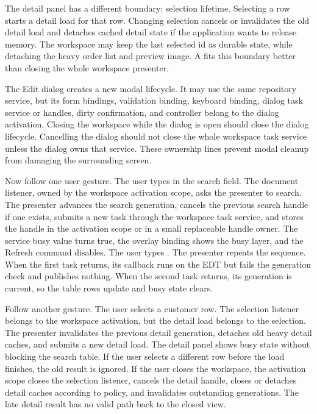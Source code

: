 The detail panel has a different boundary: selection lifetime. Selecting a row
starts a detail load for that row. Changing selection cancels or invalidates
the old detail load and detaches cached detail state if the application wants
to release memory. The workspace may keep the last selected id as durable
state, while detaching the heavy order list and preview image. A
 fits this boundary better than closing the whole
workspace presenter.

The Edit dialog creates a new modal lifecycle. It may use the same repository
service, but its form bindings, validation binding, keyboard binding, dialog
task service or handles, dirty confirmation, and controller belong to the
dialog activation. Closing the workspace while the dialog is open should close
the dialog lifecycle. Cancelling the dialog should not close the whole
workspace task service unless the dialog owns that service. These ownership
lines prevent modal cleanup from damaging the surrounding screen.

Now follow one user gesture. The user types  in the search field. The
document listener, owned by the workspace activation scope, asks the presenter
to search. The presenter advances the search generation, cancels the previous
search handle if one exists, submits a new task through the workspace task
service, and stores the handle in the activation scope or in a small
replaceable handle owner. The service busy value turns true, the overlay
binding shows the busy layer, and the Refresh command disables. The user types
. The presenter repeats the sequence. When the first task returns,
its callback runs on the EDT but fails the generation check and publishes
nothing. When the second task returns, its generation is current, so the table
rows update and busy state clears.

Follow another gesture. The user selects a customer row. The selection listener
belongs to the workspace activation, but the detail load belongs to the
selection. The presenter invalidates the previous detail generation, detaches
old heavy detail caches, and submits a new detail load. The detail panel shows
busy state without blocking the search table. If the user selects a different
row before the load finishes, the old result is ignored. If the user closes the
workspace, the activation scope closes the selection listener, cancels the
detail handle, closes or detaches detail caches according to policy, and
invalidates outstanding generations. The late detail result has no valid path
back to the closed view.

